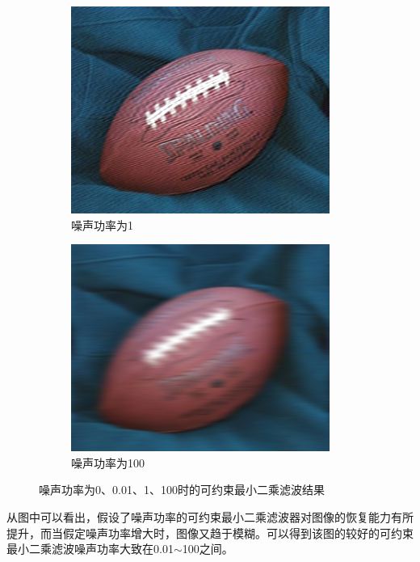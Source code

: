 \documentclass[a4paper]{ctexart}
\newcommand{\outwfour}{0.23\textwidth}
\begin{document}
\begin{spacing}{1.35}
\begin{figure}[htbp]
		\begin{subfigure}[t]{\outwfour}
			\centering
			\includegraphics[width=\textwidth]{figure/deconvreg3.png}
			\caption{噪声功率为1}
		\end{subfigure}
		\begin{subfigure}[t]{\outwfour}
			\centering
			\includegraphics[width=\textwidth]{figure/deconvreg4.png}
			\caption{噪声功率为100}
		\end{subfigure}
		\caption{噪声功率为0、0.01、1、100时的可约束最小二乘滤波结果}
		\label{fig:4reg}
	\end{figure}
	从图中可以看出，假设了噪声功率的可约束最小二乘滤波器对图像的恢复能力有所提升，而当假定噪声功率增大时，图像又趋于模糊。可以得到该图的较好的可约束最小二乘滤波噪声功率大致在0.01$\sim$100之间。


\end{spacing}
\end{document}

